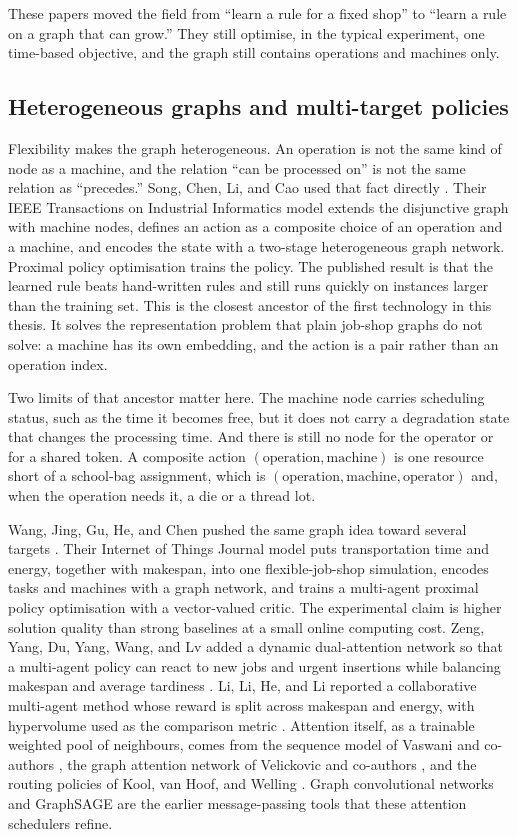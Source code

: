 These papers moved the field from ``learn a rule for a fixed shop'' to ``learn a rule on a graph that can grow.'' They still optimise, in the typical experiment, one time-based objective, and the graph still contains operations and machines only.

\subsection{Heterogeneous graphs and multi-target policies}

Flexibility makes the graph heterogeneous. An operation is not the same kind of node as a machine, and the relation ``can be processed on'' is not the same relation as ``precedes.'' Song, Chen, Li, and Cao used that fact directly \cite{song2023}. Their IEEE Transactions on Industrial Informatics model extends the disjunctive graph with machine nodes, defines an action as a composite choice of an operation and a machine, and encodes the state with a two-stage heterogeneous graph network. Proximal policy optimisation trains the policy. The published result is that the learned rule beats hand-written rules and still runs quickly on instances larger than the training set. This is the closest ancestor of the first technology in this thesis. It solves the representation problem that plain job-shop graphs do not solve: a machine has its own embedding, and the action is a pair rather than an operation index.

Two limits of that ancestor matter here. The machine node carries scheduling status, such as the time it becomes free, but it does not carry a degradation state that changes the processing time. And there is still no node for the operator or for a shared token. A composite action \((\text{operation},\text{machine})\) is one resource short of a school-bag assignment, which is \((\text{operation},\text{machine},\text{operator})\) and, when the operation needs it, a die or a thread lot.

Wang, Jing, Gu, He, and Chen pushed the same graph idea toward several targets \cite{wang2025}. Their Internet of Things Journal model puts transportation time and energy, together with makespan, into one flexible-job-shop simulation, encodes tasks and machines with a graph network, and trains a multi-agent proximal policy optimisation with a vector-valued critic. The experimental claim is higher solution quality than strong baselines at a small online computing cost. Zeng, Yang, Du, Yang, Wang, and Lv added a dynamic dual-attention network so that a multi-agent policy can react to new jobs and urgent insertions while balancing makespan and average tardiness \cite{zeng2025}. Li, Li, He, and Li reported a collaborative multi-agent method whose reward is split across makespan and energy, with hypervolume used as the comparison metric \cite{li2025}. Attention itself, as a trainable weighted pool of neighbours, comes from the sequence model of Vaswani and co-authors \cite{vaswani2017}, the graph attention network of Velickovic and co-authors \cite{velickovic2018}, and the routing policies of Kool, van Hoof, and Welling \cite{kool2019}. Graph convolutional networks \cite{kipf2017} and GraphSAGE \cite{hamilton2017} are the earlier message-passing tools that these attention schedulers refine.

